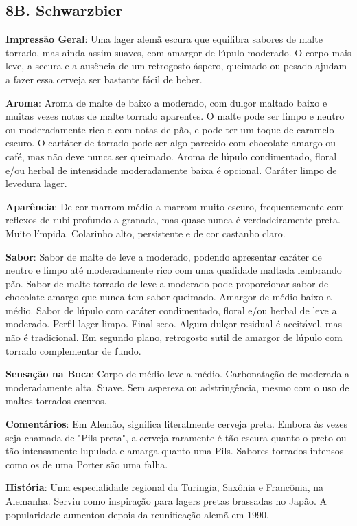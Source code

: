 \subsection*{8B. Schwarzbier}
\textbf{Impressão Geral}: Uma lager alemã escura que equilibra sabores de malte torrado, mas ainda assim suaves, com amargor de lúpulo moderado. O corpo mais leve, a secura e a ausência de um retrogosto áspero, queimado ou pesado ajudam a fazer essa cerveja ser bastante fácil de beber.

\textbf{Aroma}: Aroma de malte de baixo a moderado, com dulçor maltado baixo e muitas vezes notas de malte torrado aparentes. O malte pode ser limpo e neutro ou moderadamente rico e com notas de pão, e pode ter um toque de caramelo escuro. O cartáter de torrado pode ser algo parecido com chocolate amargo ou café, mas não deve nunca ser queimado. Aroma de lúpulo condimentado, floral e/ou herbal de intensidade moderadamente baixa é opcional. Caráter limpo de levedura lager.

\textbf{Aparência}: De cor marrom médio a marrom muito escuro, frequentemente com reflexos de rubi profundo a granada, mas quase nunca é verdadeiramente preta. Muito límpida. Colarinho alto, persistente e de cor castanho claro.

\textbf{Sabor}: Sabor de malte de leve a moderado, podendo apresentar caráter de neutro e limpo até moderadamente rico com uma qualidade maltada lembrando pão. Sabor de malte torrado de leve a moderado pode proporcionar sabor de chocolate amargo que nunca tem sabor queimado. Amargor de médio-baixo a médio. Sabor de lúpulo com caráter condimentado, floral e/ou herbal de leve a moderado. Perfil lager limpo. Final seco. Algum dulçor residual é aceitável, mas não é tradicional. Em segundo plano, retrogosto sutil de amargor de lúpulo com torrado complementar de fundo.

\textbf{Sensação na Boca}: Corpo de médio-leve a médio. Carbonatação de moderada a moderadamente alta. Suave. Sem aspereza ou adstringência, mesmo com o uso de maltes torrados escuros.

\textbf{Comentários}: Em Alemão, significa literalmente cerveja preta. Embora às vezes seja chamada de "Pils preta", a cerveja raramente é tão escura quanto o preto ou tão intensamente lupulada e amarga quanto uma Pils. Sabores torrados intensos como os de uma Porter são uma falha.

\textbf{História}: Uma especialidade regional da Turingia, Saxônia e Francônia, na Alemanha. Serviu como inspiração para lagers pretas brassadas no Japão. A popularidade aumentou depois da reunificação alemã em 1990.

